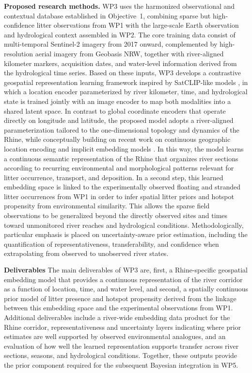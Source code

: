 \documentclass{scrartcl}
\begin{document}
\textbf{Proposed research methods.} WP3 uses the harmonized observational and contextual database established in Objective~1, combining sparse but high-confidence litter observations from WP1 with the large-scale Earth observation and hydrological context assembled in WP2. The core training data consist of multi-temporal Sentinel-2 imagery from 2017 onward, complemented by high-resolution aerial imagery from Geobasis NRW, together with river-aligned kilometer markers, acquisition dates, and water-level information derived from the hydrological time series. Based on these inputs, WP3 develops a contrastive geospatial representation learning framework inspired by SatCLIP-like models \citep{klemmer2025satclip}, in which a location encoder parameterized by river kilometer, time, and hydrological state is trained jointly with an image encoder to map both modalities into a shared latent space. In contrast to global coordinate encoders that operate directly on longitude and latitude, the proposed model adopts a river-aligned parameterization tailored to the one-dimensional topology and dynamics of the Rhine, while conceptually building on recent work on continuous geographic location encoding and implicit embedding models \citep{russwurm2024geographic,klemmer2025earth}. In this way, the model learns a continuous semantic representation of the Rhine that organizes river sections according to recurring environmental and morphological patterns relevant for litter occurrence, transport, and deposition. In a second step, this learned embedding space is linked to the experimentally observed floating and stranded litter occurrences from WP1 in order to infer spatial litter priors and hotspot propensity from environmental similarity. This allows the sparse field observations to be generalized beyond the directly observed sites and times toward unmonitored river reaches and hydrological conditions. Methodologically, particular emphasis is placed on uncertainty-aware prior estimation, including the quantification of representativeness, transferability, and confidence when extrapolating from observed to unobserved river states.

\textbf{Deliverables} The main deliverables of WP3 are, first, a Rhine-specific geospatial embedding model that provides a continuous representation of the river corridor as a function of location, time, and water level, and second, a spatially continuous prior model of litter presence and hotspot propensity derived from the linkage between this embedding space and the experimental observations from WP1. Additional deliverables include a river-wide embedding data product for the Rhine corridor, representativeness and uncertainty layers indicating where prior estimates are well supported by observed environmental analogues, and an evaluation of how well the learned representation supports transfer across river sections, seasons, and hydrological conditions. Together, these outputs provide the prior component required for the subsequent Bayesian integration in WP5.
\end{document}

